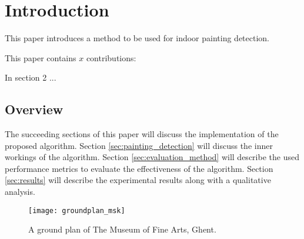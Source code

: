 \section{Introduction}
	This paper introduces a method to be used for indoor painting detection. 
	
	
	
	
	
	
	
	
	This paper contains $x$ contributions:
	
	
	In section 2 ...
	
	\subsection{Overview}
	The succeeding sections of this paper will discuss the implementation of the proposed algorithm. Section \ref{sec:painting_detection} will discuss the inner workings of the algorithm. Section \ref{sec:evaluation_method} will describe the used performance metrics to evaluate the effectiveness of the algorithm. Section \ref{sec:results} will describe the experimental results along with a qualitative analysis.
	

	
	\begin{figure}
		\texttt{[image: groundplan\_msk]}
		\caption{A ground plan of The Museum of Fine Arts, Ghent. }
		\label{fig:groundplan_msk}
	\end{figure}